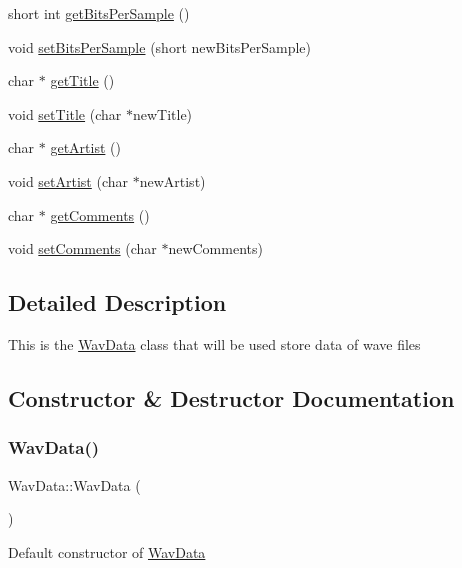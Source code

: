 \begin{DoxyCompactItemize}
short int \hyperlink{classWavData_aa841d005b1060f436a28e032626745fa}{get\+Bits\+Per\+Sample} ()
\item 
void \hyperlink{classWavData_a95eabeda93c6515bb0c4541935261678}{set\+Bits\+Per\+Sample} (short new\+Bits\+Per\+Sample)
\item 
char $\ast$ \hyperlink{classWavData_af721e19f059afd5fa617c2cfce3d6526}{get\+Title} ()
\item 
void \hyperlink{classWavData_a396b417c300117a9697d3fdbcee5d250}{set\+Title} (char $\ast$new\+Title)
\item 
char $\ast$ \hyperlink{classWavData_a5b00c7a1857054f67fda34e5c4bb5802}{get\+Artist} ()
\item 
void \hyperlink{classWavData_aff3a19bb77f284e887a2c61345eed29b}{set\+Artist} (char $\ast$new\+Artist)
\item 
char $\ast$ \hyperlink{classWavData_a0db7155cf6cfe94c87b22fcb148fa349}{get\+Comments} ()
\item 
void \hyperlink{classWavData_a14c2e941261877c65214dc49203a6016}{set\+Comments} (char $\ast$new\+Comments)
\end{DoxyCompactItemize}


\subsection{Detailed Description}
This is the \hyperlink{classWavData}{Wav\+Data} class that will be used store data of wave files 

\subsection{Constructor \& Destructor Documentation}
\mbox{\label{classWavData_a794e771764e4cc905f16a5fea4fcba48}} 
\subsubsection{\texorpdfstring{Wav\+Data()}{WavData()}\hspace{0.1cm}{\footnotesize\ttfamily [1/2]}}
{\footnotesize\ttfamily Wav\+Data\+::\+Wav\+Data (\begin{DoxyParamCaption}{ }\end{DoxyParamCaption})}

Default constructor of \hyperlink{classWavData}{Wav\+Data} \mbox{\label{classWavData_ac1c36dbb380458c7b2be932a4fe18906}} 
